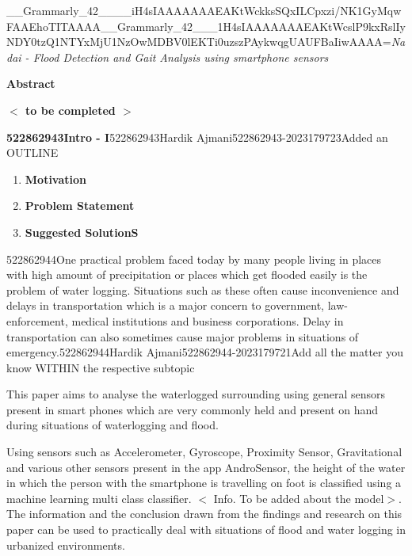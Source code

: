 \documentclass{article} %
\begin{document}


\noindent \_\_Grammarly\_42\_\_\_\_iH4sIAAAAAAAEAKtWckksSQxILCpxzi/NK1GyMqwFAAEhoTITAAAA\_\_Grammarly\_42\_\_\_1H4sIAAAAAAAEAKtWcslP9kxRslIyNDY0tzQ1NTYxMjU1NzOwMDBV0lEKTi0uzszPAykwqgUAUFBaIiwAAAA=\textit{Nadai - Flood Detection and Gait Analysis using smartphone sensors}

\textbf{}

\textbf{Abstract}

\textbf{$\boldsymbol{\mathrm{<}}$ to be completed $\boldsymbol{\mathrm{>}}$}

\textbf{522862943Intro - I}522862943Hardik Ajmani522862943-2023179723Added an OUTLINE\textbf{}

\begin{enumerate}
\item \textbf{ Motivation}

\item \textbf{ Problem Statement}

\item \textbf{ Suggested SolutionS}
\end{enumerate}

522862944One practical problem faced today by many people living in places with high amount of precipitation or places which get flooded easily is the problem of water logging. Situations such as these often cause inconvenience and delays in transportation which is a major concern to government, law-enforcement, medical institutions and business corporations. Delay in transportation can also sometimes cause major problems in situations of emergency.522862944Hardik Ajmani522862944-2023179721Add all the matter you know WITHIN the respective subtopic

\noindent This paper aims to analyse the waterlogged surrounding using general sensors present in smart phones which are very commonly held and present on hand during situations of waterlogging and flood.

Using sensors such as Accelerometer, Gyroscope, Proximity Sensor, Gravitational and various other sensors present in the app AndroSensor, the height of the water in which the person with the smartphone is travelling on foot is classified using a machine learning multi class classifier. $\mathrm{<}$ Info. To be added about the model$\mathrm{>}$. The information and the conclusion drawn from the findings and research on this paper can be used to practically deal with situations of flood and water logging in urbanized environments.
\end{document}
